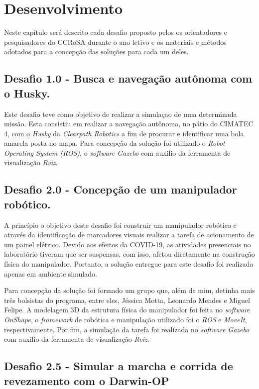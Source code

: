 \chapter{Desenvolvimento}
\label{chap:mat}

Neste capítulo será descrito cada desafio proposto pelos os orientadores e pesquisadores do CCRoSA durante o ano letivo e os materiais e métodos adotados para a concepção das soluções para cada um deles.

\section{Desafio 1.0 - Busca e navegação autônoma com o Husky.}

Este desafio teve como objetivo de realizar a simulaçao de uma determinada missão. Esta consistiu em realizar a navegação autônoma, no pátio do CIMATEC 4, com o \textit{Husky} da \textit{Clearpath Robotics} a fim de procurar e identificar uma bola amarela posta no mapa. Para concepção da solução foi utilizado o \textit{Robot Operating System (ROS)}, o \textit{software Gazebo} com auxilio da ferramenta de visualização \textit{Rviz}. 

\section{Desafio 2.0 - Concepção de um manipulador robótico.}
\label{sec:desafio2.0}

A princípio o objetivo deste desafio foi construir um manipulador robótico e através da identificação de marcadores visuais realizar a tarefa de acionamento de um painel elétrico. Devido aos efeitos da COVID-19, as atividades presenciais no laboratório tiveram que ser suspensas, com isso, afetou diretamente na construção física do manipulador. Portanto, a solução entregue para este desafio foi realizada apenas em ambiente simulado. 

Para concepção da solução foi formado um grupo que, além de mim, detinha mais três bolsistas do programa, entre eles, Jéssica Motta, Leonardo Mendes e Miguel Felipe. A modelagem 3D da estrutura física do manipulador foi feita no \textit{software OnShape}, o \textit{framework} de robótica e manipulação utilizado foi o \textit{ROS} e \textit{MoveIt}, respectivamente. Por fim, a simulação da tarefa foi realizada no \textit{software Gazebo} com auxilio da ferramenta de visualização \textit{Rviz}. 

\section{Desafio 2.5 - Simular a marcha e corrida de revezamento com o Darwin-OP}
\label{sec:desafio2.5}

